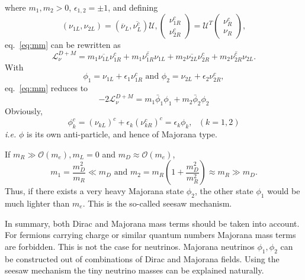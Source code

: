 where $m_{1}, m_{2} > 0$, $\epsilon_{1,2} = \pm 1$, and defining
\begin{equation}
  \label{eq:mvet}
  (\nu_{1L}, \nu_{2L}) = \left( \overline{\nu}_{L},                 \overline{\nu^{c}_{L}} \right) \mathcal{U},
  \left(\begin{array}{c} \nu^{c}_{1R} \\            
      \nu^{c}_{2R}\end{array}\right) = \mathcal{U}^{T}
  \left(\begin{array}{c} \nu^{c}_{R} \\ \nu_{R} \end{array}\right),
\end{equation}
eq.~\ref{eq:mm} can be rewritten as
\begin{equation}
  \label{eq:m12}
  \mathcal{L}_{\nu}^{D+M} = m_{1}\overline{\nu_{1L}}\nu^{c}_{1R} +  
  m_{1}\overline{\nu^{c}_{1R}}\nu_{1L} +
  m_{2}\overline{\nu_{2L}}\nu^{c}_{2R} +  
  m_{2}\overline{\nu^{c}_{2R}}\nu_{2L}.
\end{equation}
With
\begin{equation}
  \label{eq:mafi}
  \phi_{1} = \nu_{1L} + \epsilon_{1}\nu^{c}_{1R}
  \mbox{\ \ \ and \ \ \ }
  \phi_{2} = \nu_{2L} + \epsilon_{2}\nu^{c}_{2R},
\end{equation}
eq.~\ref{eq:mm} reduces to
\begin{equation}
  \label{eq:mv}
  -2\mathcal{L}_{\nu}^{D+M} = m_{1}\bar{\phi}_{1}\phi_{1} +
  m_{2}\bar{\phi}_{2}\phi_{2}
\end{equation}
Obviously,
\begin{equation}
  \label{eq:mach}
  \phi^{c}_{k} = (\nu_{kL})^{c} + \epsilon_{k}(\nu^{c}_{kR})^{c} =
  \epsilon_{k}\phi_{k}, ~~~ (k=1,2)
\end{equation}
\textit{i.e.} $\phi$ is its own anti-particle, and hence of Majorana type.

If $m_{R} \gg \mathcal{O}(m_{e}), m_{L}=0$ and $m_{D} \approx \mathcal{O}(m_{e})$,
\begin{equation}
  \label{eq:seesaw}
  m_{1} = \frac{m^{2}_{D}}{m_{R}}\ll m_{D}  \mbox{\ \ \ and \ \ \ }  
  m_{2} = m_{R}(1+\frac{m^{2}_{D}}{m^{2}_{R}}) \approx m_{R} \gg m_{D}.
\end{equation}
Thus, if there exists a very heavy Majorana state $\phi_2$, the other state $\phi_1$ would be much lighter than $m_e$. This is the so-called seesaw mechanism.

In summary, both Dirac and Majorana mass terms should be taken into account. For fermions carrying charge or similar quantum numbers Majorana mass terms are forbidden. This is not the case for neutrinos. Majorana neutrinos $\phi_{1}, \phi_{2}$ can be constructed out of combinations of Dirac and Majorana fields. Using the seesaw mechanism the tiny neutrino masses can be explained naturally.

